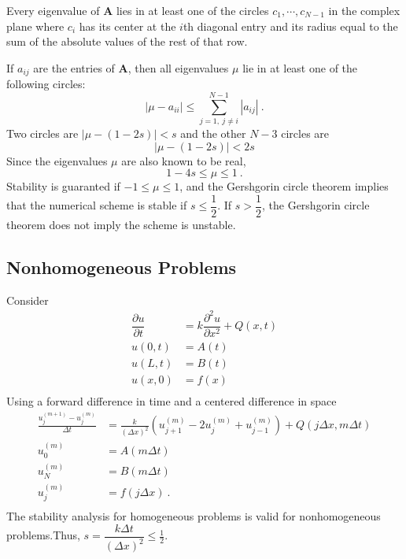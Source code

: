 \documentclass[12pt,a4paper]{article}
\renewcommand{\vec}[1]{\boldsymbol{#1}}
\newcounter{theo}[section]\setcounter{theo}{0}
\begin{document}
\begin{tcolorbox}[colback=green!15,colframe=green!40!black,title= Gershgorin circle Theorem]
Every eigenvalue of $\vec{A}$ lies in at least one of the circles $c_1,\cdots, c_{N-1}$ in the complex plane where $c_i$ has its center at the $i$th diagonal entry and its radius equal to the sum of the absolute values of the rest of that row.
\end{tcolorbox}
If $a_{ij}$ are the entries of $\vec{A}$, then all eigenvalues $\mu$ lie in at least one of the following circles:
\begin{equation}
|\mu -a_{ii}| \leqslant \sum_{j=1, ~j\neq i}^{N-1} |a_{ij}| ~.
\end{equation}
Two circles are $|\mu-(1-2s)|<s$ and the other $N-3$ circles are
\begin{equation}
|\mu-(1-2s)| < 2s
\end{equation}
Since the eigenvalues $\mu$ are also known to be real,
\begin{equation*}
1-4s \leqslant \mu \leqslant 1~.
\end{equation*}
Stability is guaranted if $-1\leqslant \mu \leqslant 1$, and the Gershgorin circle theorem implies that the numerical scheme is stable if $s \leqslant \dfrac{1}{2}$. If $s > \dfrac{1}{2}$, the Gershgorin circle theorem does not imply the scheme is unstable.



\subsection{Nonhomogeneous Problems}
Consider
\begin{align*}
\dfrac{\partial u}{\partial t} &= k \dfrac{\partial^2 u}{\partial x^2} +Q(x, t)\\
u(0, t) &= A(t) \\
u(L, t) &= B(t) \\
u(x, 0) &= f(x) \\
\end{align*}
Using a forward difference in time and a centered difference in space
\begin{align*}
\frac{u_j^{(m+1)} -u_j^{(m)} }{\Delta t} &= \frac{k}{(\Delta x)^2} \left( u_{j+1}^{(m)} -2u_{j}^{(m)} + u_{j-1}^{(m)} \right) +Q(j\Delta x, m \Delta t) \\
u_0^{(m)} &= A(m\Delta t) \\
u_N^{(m)} &= B(m\Delta t) \\
u_j^{(m)} &= f(j\Delta x) ~. \\
\end{align*}
The stability analysis for homogeneous problems is valid for nonhomogeneous problems.Thus, $s=\dfrac{k \Delta t}{(\Delta x)^2} \leqslant \frac{1}{2}$.
\end{document}
